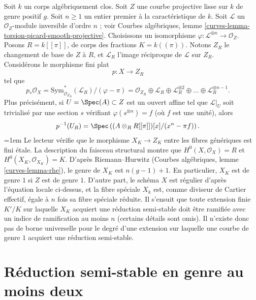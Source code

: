 \begin{example}
\label{example-extension-necessary-genus-one}
Soit $k$ un corps algébriquement clos. Soit $Z$ une courbe projective lisse
sur $k$ de genre positif $g$. Soit $n\geq1$ un entier premier à la
caractéristique de $k$. Soit $\mathcal{L}$ un $\mathcal{O}_Z$-module
inversible d'ordre $n$ ; voir Courbes algébriques, lemme
\ref{curves-lemma-torsion-picard-smooth-projective}. Choisissons un
isomorphisme $\varphi:\mathcal{L}^{\otimes n}\to\mathcal{O}_Z$.
Posons $R=k[[\pi]]$, de corps des fractions $K=k((\pi))$. Notons $Z_R$ le
changement de base de $Z$ à $R$, et $\mathcal{L}_R$ l'image réciproque de
$\mathcal{L}$ sur $Z_R$. Considérons le morphisme fini plat
$$
p : X \longrightarrow Z_R
$$
tel que
$$
p_*\mathcal{O}_X =
\text{Sym}^*_{\mathcal{O}_{Z_R}}(\mathcal{L}_R)/(\varphi - \pi) =
\mathcal{O}_{Z_R} \oplus \mathcal{L}_R \oplus
\mathcal{L}_R^{\otimes 2} \oplus \ldots \oplus \mathcal{L}_R^{\otimes n - 1}.
$$
Plus précisément, si $U=\Spec(A)\subset Z$ est un ouvert affine tel que
$\mathcal{L}|_U$ soit trivialisé par une section $s$ vérifiant
$\varphi(s^{\otimes n})=f$ (où $f$ est une unité), alors
$$
p^{-1}(U_R) = \Spec\left(
(A \otimes_R R[[\pi]])[x]/(x^n - \pi f)
\right).
$$
\begingroup
\emergencystretch=1em
Le lecteur vérifie que le morphisme $X_K\to Z_K$ entre les fibres
génériques est fini étale. La description du faisceau structural montre
que $H^0(X,\mathcal{O}_X)=R$ et $H^0(X_K,\mathcal{O}_{X_K})=K$.
D'après Riemann--Hurwitz (Courbes algébriques, lemme
\ref{curves-lemma-rhe}), le genre de $X_K$ est $n(g-1)+1$. En particulier,
$X_K$ est de genre $1$ si $Z$ est de genre $1$. D'autre part, le schéma
$X$ est régulier d'après l'équation locale ci-dessus, et la fibre spéciale
$X_k$ est, comme diviseur de Cartier effectif, égale à $n$ fois sa fibre
spéciale réduite. Il s'ensuit que toute extension finie $K'/K$ sur laquelle
$X_K$ acquiert une réduction semi-stable doit être ramifiée avec un indice
de ramification au moins $n$ (certains détails sont omis). Il n'existe donc
pas de borne universelle pour le degré d'une extension sur laquelle une
courbe de genre $1$ acquiert une réduction semi-stable.
\par
\endgroup
\end{example}






\section{Réduction semi-stable en genre au moins deux}
\label{section-semistable-reduction-genus-at-least-two}

